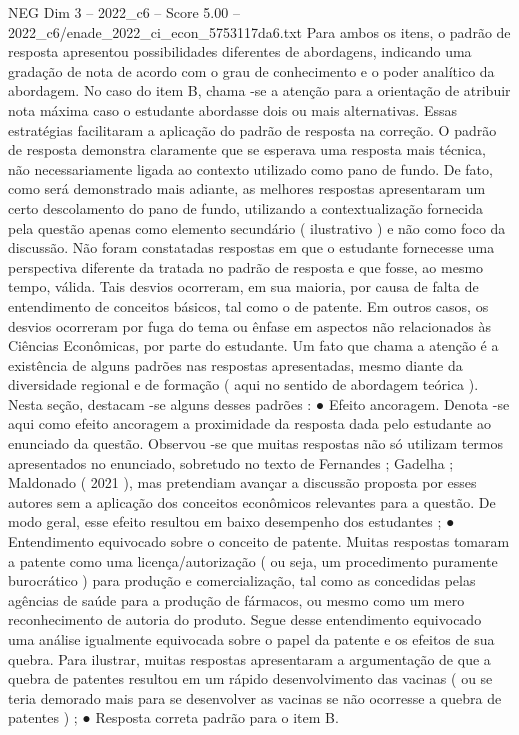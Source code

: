 \begin{textsample}{NEG Dim 3 – 2022\_c6 – Score 5.00 – 2022\_c6/enade\_2022\_ci\_econ\_5753117da6.txt}
Para ambos os itens, o padrão de resposta apresentou possibilidades diferentes de abordagens, indicando uma gradação de nota de acordo com o grau de conhecimento e o poder analítico da abordagem.
No caso do item B, chama -se a atenção para a orientação de atribuir nota máxima caso o estudante abordasse dois ou mais alternativas.
Essas estratégias facilitaram a aplicação do padrão de resposta na correção.
O padrão de resposta demonstra claramente que se esperava uma resposta mais técnica, não necessariamente ligada ao contexto utilizado como pano de fundo.
De fato, como será demonstrado mais adiante, as melhores respostas apresentaram um certo descolamento do pano de fundo, utilizando a contextualização fornecida pela questão apenas como elemento secundário ( ilustrativo ) e não como foco da discussão.
Não foram constatadas respostas em que o estudante fornecesse uma perspectiva diferente da tratada no padrão de resposta e que fosse, ao mesmo tempo, válida.
Tais desvios ocorreram, em sua maioria, por causa de falta de entendimento de conceitos básicos, tal como o de patente.
Em outros casos, os desvios ocorreram por fuga do tema ou ênfase em aspectos não relacionados às Ciências Econômicas, por parte do estudante.
Um fato que chama a atenção é a existência de alguns padrões nas respostas apresentadas, mesmo diante da diversidade regional e de formação ( aqui no sentido de abordagem teórica ).
Nesta seção, destacam -se alguns desses padrões : {\EmojiFont ●} Efeito ancoragem.
Denota -se aqui como efeito ancoragem a proximidade da resposta dada pelo estudante ao enunciado da questão.
Observou -se que muitas respostas não só utilizam termos apresentados no enunciado, sobretudo no texto de Fernandes ; Gadelha ; Maldonado ( 2021 ), mas pretendiam avançar a discussão proposta por esses autores sem a aplicação dos conceitos econômicos relevantes para a questão.
De modo geral, esse efeito resultou em baixo desempenho dos estudantes ; {\EmojiFont ●} Entendimento equivocado sobre o conceito de patente.
Muitas respostas tomaram a patente como uma licença/autorização ( ou seja, um procedimento puramente burocrático ) para produção e comercialização, tal como as concedidas pelas agências de saúde para a produção de fármacos, ou mesmo como um mero reconhecimento de autoria do produto.
Segue desse entendimento equivocado uma análise igualmente equivocada sobre o papel da patente e os efeitos de sua quebra.
Para ilustrar, muitas respostas apresentaram a argumentação de que a quebra de patentes resultou em um rápido desenvolvimento das vacinas ( ou se teria demorado mais para se desenvolver as vacinas se não ocorresse a quebra de patentes ) ; {\EmojiFont ●} Resposta correta padrão para o item B.

\end{textsample}
